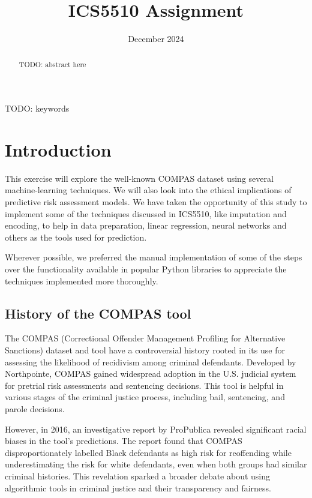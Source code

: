 \documentclass[conference]{IEEEtran}
\begin{document}
	
	\title{ICS5510 Assignment}
	
	\author{
		\date{December 2024}
		
	}
	
	\maketitle
	
	\begin{abstract}
	TODO: abstract here
	\end{abstract}
	
	\begin{IEEEkeywords}
		TODO: keywords
	\end{IEEEkeywords}
	
	\section{Introduction}

	This exercise will explore the well-known COMPAS dataset using several machine-learning techniques. We will also look into the ethical implications of predictive risk assessment models. We have taken the opportunity of this study to implement some of the techniques discussed in ICS5510, like imputation and encoding, to help in data preparation, linear regression, neural networks and others as the tools used for prediction.
	
	Wherever possible, we preferred the manual implementation of some of the steps over the functionality available in popular Python libraries to appreciate the techniques implemented more thoroughly.
	
	\subsection{History of the COMPAS tool}
	
	The COMPAS (Correctional Offender Management Profiling for Alternative Sanctions) dataset and tool have a controversial history rooted in its use for assessing the likelihood of recidivism among criminal defendants. Developed by Northpointe, COMPAS gained widespread adoption in the U.S. judicial system for pretrial risk assessments and sentencing decisions. This tool is helpful in various stages of the criminal justice process, including bail, sentencing, and parole decisions.
	
	However, in 2016, an investigative report by ProPublica revealed significant racial biases in the tool's predictions. The report found that COMPAS disproportionately labelled Black defendants as high risk for reoffending while underestimating the risk for white defendants, even when both groups had similar criminal histories. This revelation sparked a broader debate about using algorithmic tools in criminal justice and their transparency and fairness. 
	
\end{document}
